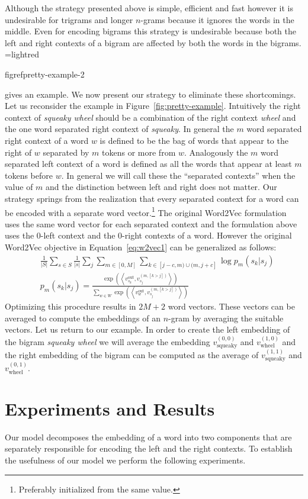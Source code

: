 \documentclass{article}
\makeatletter
\newcommand{\mybox}[2][lightred]{%
  \setbox0=\hbox{#1}%
  \setlength{\@tempdima}{\dimexpr\wd0+13pt}%
  \begin{tcolorbox}[%
    hbox,%
    halign=justify,
    nobeforeafter,%
    colframe=black,%
    colback=#1,%
    boxrule=.5pt,%
    arc=5pt,%
    left=4pt,right=0pt,top=0pt,bottom=0pt,%
    boxsep=2pt]%
    #2
  \end{tcolorbox}
}
\newcommand{\figref}[1]{Figure~\ref{#1}}
\renewcommand{\eqref}[1]{Equation~\ref{#1}}
\newcommand{\vo}[1]{v^{\textrm{out}}_{#1}}
\newcommand{\ip}[2]{\left\langle#1, #2\right\rangle}
\newcommand{\wv}{Word2Vec\xspace}
\makeatother
\begin{document}
Although the strategy presented above is simple, efficient and fast however it
is undesirable for trigrams and longer $n$-grams because it ignores the words in
the middle. Even for encoding bigrams this strategy is undesirable because
both the left and right contexts of a bigram are affected by both the words in the
bigrams. \mybox{figref{pretty-example-2}} gives an example.
We now present our strategy to eliminate these shortcomings. Let us reconsider
the example in \figref{fig:pretty-example}. Intuitively the right context of
\textit{squeaky wheel} should be a combination of the right context
\textit{wheel} and the one word separated right context of \textit{squeaky}.
In general the $m$ word separated right context of a word $w$ is defined to be
the bag of words that appear to the right of $w$ separated by $m$ tokens or more
from $w$. Analogously the $m$ word separated left context of a word is defined
as all the words that appear at least $m$ tokens before $w$. In general we will
call these the ``{separated contexts}'' when the value of $m$ and the
distinction between left and right does not matter. Our strategy
springs from the realization that every separated context for a word can be
encoded with a separate word vector.\footnote{Preferably initialized from the
  same value.} The original \wv formulation uses the same word vector for each
separated context and the formulation above uses the $0$-left context and the
$0$-right contexts of a word. However the original \wv objective in
\eqref{eq:w2vec1} can be generalized as follows:
\begin{align}\label{eq:general}
  &\frac{1}{|S|} \sum_{s \in S} \frac{1}{|s|} \sum_{j} \sum_{m \in [0, M]} \sum_{k \in [j-c,m) \cup (m,j+c]} \log p_m(s_k | s_j)\\
  &p_m(s_k | s_j) = \frac{\exp\left(\ip{\vo{s_k}}{v_{s_j}^{(m,[k>j])}}\right)}{\sum_{w \in W}\exp\left(\ip{\vo{w}}{v_{s_j}^{(m,[k>j])}}\right)}
\end{align}
Optimizing this procedure results in $2M+2$ word vectors. These vectors can be
averaged to compute the embeddings of an $n$-gram by averaging the suitable
vectors. Let us return to our example. In order to create the left embedding of the
bigram \textit{squeaky wheel} we will average the embedding
$v_{\textrm{squeaky}}^{(0,0)}$ and $v_{\textrm{wheel}}^{(1,0)}$ and the right embedding of the
bigram can be computed as the average of
$v_{\textrm{squeaky}}^{(1,1)}$ and $v_{\textrm{wheel}}^{(0,1)}$.

\section{Experiments and Results}
\label{sec:experiments-results}
Our model decomposes the embedding of a word into two components that are
separately responsible for encoding the left and the right contexts. To
establish the usefulness of our model we perform the following experiments.
\end{document}
